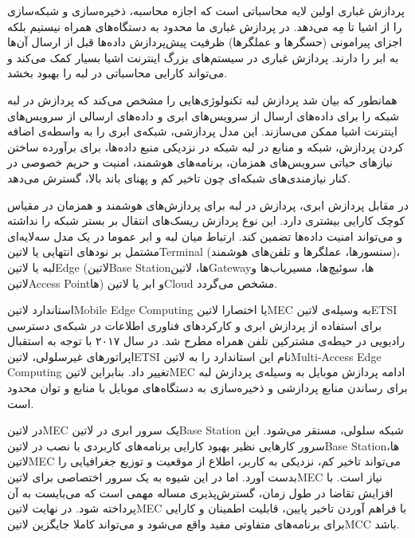 پردازش غباری اولین لایه محاسباتی است که اجازه محاسبه، ذخیره‌سازی و شبکه‌سازی را از اشیا تا مِه می‌دهد. در پردازش غباری ما محدود به دستگاه‌های همراه نیستیم بلکه اجزای پیرامونی (حسگرها و عملگرها)
ظرفیت پیش‌پردازش داده‌ها قبل از ارسال آن‌ها به ابر را دارند. پردازش غباری در سیستم‌های بزرگ اینترنت اشیا بسیار کمک می‌کند و می‌تواند کارایی محاسباتی در لبه را بهبود بخشد.


همانطور که بیان شد پردازش لبه تکنولوژی‌هایی را مشخص می‌کند که پردازش در لبه شبکه را برای داده‌های ارسال از سرویس‌های ابری و داده‌های ارسالی از سرویس‌های اینترنت اشیا ممکن می‌سازند.
این مدل پردازشی، شبکه‌ی ابری را به واسطه‌ی اضافه کردن پردازش، شبکه و منابع در لبه شبکه در نزدیکی منبع داده‌ها، برای برآورده ساختن نیازهای حیاتی سرویس‌های همزمان، برنامه‌های هوشمند،
امنیت و حریم خصوصی در کنار نیازمندی‌های شبکه‌ای چون تاخیر کم و پهنای باند بالا، گسترش می‌دهد.

در مقابل پردازش ابری، پردازش در لبه برای پردازش‌های هوشمند و همزمان در مقیاس کوچک کارایی بیشتری دارد. این نوع پردازش ریسک‌های انتقال بر بستر شبکه را نداشته و می‌تواند امنیت داده‌ها تضمین کند.
ارتباط میان لبه و ابر عموما در یک مدل سه‌لایه‌ای مشتمل بر نودهای انتهایی یا ‌لاتین{Terminal} (سنسورها، عملگرها و تلفن‌های هوشمند)،
لبه یا ‌لاتین{Edge} (‌لاتین{Base Station}ها، ‌لاتین{Gateway}ها، سوئیچ‌ها، مسیریاب‌ها و ‌لاتین{Access Point}ها)
و ابر یا ‌لاتین{Cloud} مشخص می‌گردد.


استاندارد ‌لاتین{Mobile Edge Computing} یا اختصارا ‌لاتین{MEC} به وسیله‌ی ‌لاتین{ETSI} برای استفاده از پردازش ابری و کارکردهای فناوری اطلاعات در شبکه‌ی دسترسی رادیویی
در حیطه‌ی مشترکین تلفن همراه مطرح شد. در سال ۲۰۱۷ با توجه به استقبال اپراتورهای غیرسلولی، ‌لاتین{ETSI} نام این استاندارد را به ‌لاتین{Multi-Access Edge Computing}
تغییر داد. بنابراین ‌لاتین{MEC} ادامه پردازش موبایل به وسیله‌ی پردازش لبه برای رساندن منابع پردازشی و ذخیره‌سازی به دستگاه‌های موبایل با منابع و توان محدود است.

در ‌لاتین{MEC} یک سرور ابری در ‌لاتین{Base Station} شبکه سلولی، مستقر می‌شود. این سرور کارهایی نظیر بهبود کارایی برنامه‌های کاربردی
با نصب در ‌لاتین{Base Station}ها، ‌لاتین{MEC} می‌تواند تاخیر کم، نزدیکی به کاربر، اطلاع از موقعیت و توزیع جغرافیایی را بدست آورد.
اما در این شیوه به یک سرور اختصاصی برای ‌لاتین{MEC} نیاز است.
با افزایش تقاضا در طول زمان، گسترش‌پذیری مساله مهمی است که می‌بایست به آن پرداخته شود.
در نهایت ‌لاتین{MEC} با فراهم آوردن تاخیر پایین، قابلیت اطمینان و کارایی برای برنامه‌های متفاوتی مفید واقع می‌شود و می‌تواند کاملا جایگزین ‌لاتین{MCC} باشد.

